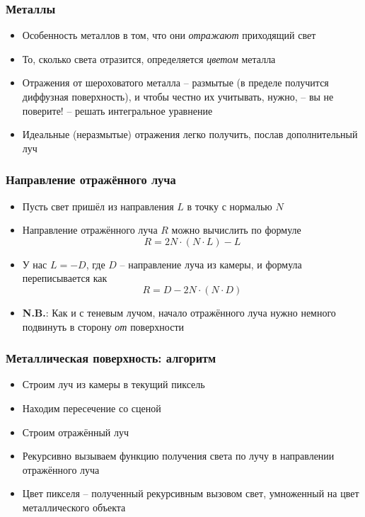 \documentclass[10pt]{beamer}
\begin{document}
\begin{frame}[fragile]
\frametitle{Металлы}
\begin{itemize}
\item Особенность металлов в том, что они \textit{отражают} приходящий свет
\pause
\item То, сколько света отразится, определяется \textit{цветом} металла
\pause
\item Отражения от шероховатого металла -- размытые (в пределе получится диффузная поверхность), и чтобы честно их учитывать, нужно, -- вы не поверите! -- решать интегральное уравнение
\pause
\item Идеальные (неразмытые) отражения легко получить, послав дополнительный луч
\end{itemize}
\end{frame}

\begin{frame}[fragile]
\frametitle{Направление отражённого луча}
\begin{itemize}
\item Пусть свет пришёл из направления \begin{math}L\end{math} в точку с нормалью \begin{math}N\end{math}
\pause
\item Направление отражённого луча \begin{math}R\end{math} можно вычислить по формуле 
\begin{equation*}
R = 2N\cdot(N \cdot L) - L
\end{equation*}
\pause
\item У нас \begin{math}L=-D\end{math}, где \begin{math}D\end{math} -- направление луча из камеры, и формула переписывается как
\begin{equation*}
R = D - 2N\cdot(N \cdot D)
\end{equation*}
\pause
\item \alert{\textbf{N.B.}}: Как и с теневым лучом, начало отражённого луча нужно немного подвинуть в сторону \textit{от} поверхности
\end{itemize}
\end{frame}

\begin{frame}[fragile]
\frametitle{Металлическая поверхность: алгоритм}
\begin{itemize}
\item Строим луч из камеры в текущий пиксель
\pause
\item Находим пересечение со сценой
\pause
\item Строим отражённый луч
\pause
\item Рекурсивно вызываем функцию получения света по лучу в направлении отражённого луча
\pause
\item Цвет пикселя -- полученный рекурсивным вызовом свет, умноженный на цвет металлического объекта
\end{itemize}
\end{frame}
\end{document}
